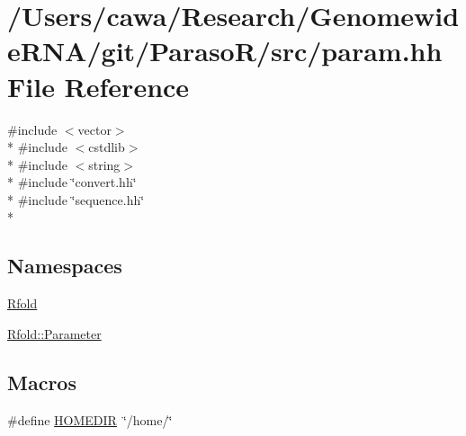 \hypertarget{param_8hh}{\section{/\+Users/cawa/\+Research/\+Genomewide\+R\+N\+A/git/\+Paraso\+R/src/param.hh File Reference}
\label{param_8hh}
}
{\ttfamily \#include $<$vector$>$}\\*
{\ttfamily \#include $<$cstdlib$>$}\\*
{\ttfamily \#include $<$string$>$}\\*
{\ttfamily \#include \char`\"{}convert.\+hh\char`\"{}}\\*
{\ttfamily \#include \char`\"{}sequence.\+hh\char`\"{}}\\*
\subsection*{Namespaces}
\begin{DoxyCompactItemize}
\item 
 \hyperlink{namespace_rfold}{Rfold}
\item 
 \hyperlink{namespace_rfold_1_1_parameter}{Rfold\+::\+Parameter}
\end{DoxyCompactItemize}
\subsection*{Macros}
\begin{DoxyCompactItemize}
\item 
\#define \hyperlink{param_8hh_abd012aab0d5d08997f31c0eeedebb40d}{H\+O\+M\+E\+D\+I\+R}~\char`\"{}/home/\char`\"{}
\end{DoxyCompactItemize}

